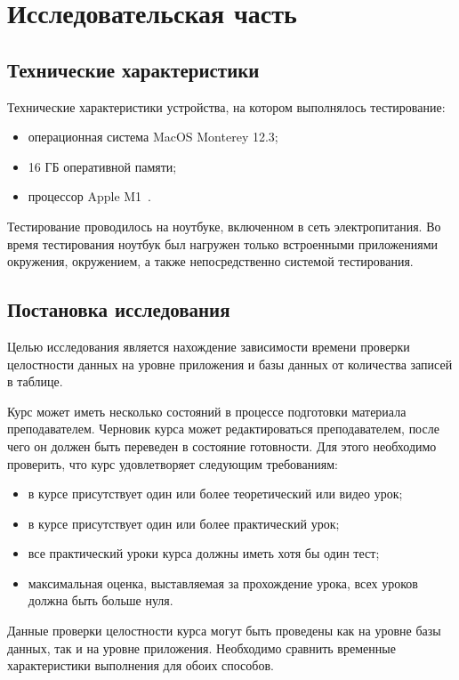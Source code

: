 \chapter{Исследовательская часть}

\section{Технические характеристики}

Технические характеристики устройства, на котором выполнялось тестирование:
\begin{itemize}
	\item операционная система MacOS Monterey 12.3;
	\item 16 ГБ оперативной памяти;
    \item процессор Apple M1~\cite{M1}.
\end{itemize}

Тестирование проводилось на ноутбуке, включенном в сеть электропитания. 
Во время тестирования ноутбук был нагружен только встроенными приложениями окружения, окружением, а также непосредственно системой тестирования.

\section{Постановка исследования}

Целью исследования является нахождение зависимости времени проверки
целостности данных на уровне приложения и базы данных от количества записей в таблице.

Курс может иметь несколько состояний в процессе подготовки материала преподавателем. Черновик курса может редактироваться преподавателем, после чего он должен быть переведен в состояние готовности. Для этого необходимо проверить, что курс удовлетворяет следующим требованиям:
\begin{itemize}
    \item в курсе присутствует один или более теоретический или видео урок;
    \item в курсе присутствует один или более практический урок;
    \item все практический уроки курса должны иметь хотя бы один тест;
    \item максимальная оценка, выставляемая за прохождение урока, всех уроков должна быть больше нуля.
\end{itemize}

Данные проверки целостности курса могут быть проведены как на уровне базы данных, так и на уровне приложения. Необходимо сравнить временные характеристики выполнения для обоих способов. 

